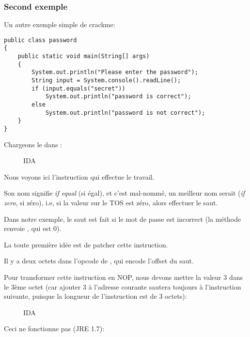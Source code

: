 \subsubsection{Second exemple}

Un autre exemple simple de crackme:

\begin{lstlisting}[style=customjava]
public class password
{
	public static void main(String[] args)
	{
		System.out.println("Please enter the password");
		String input = System.console().readLine();
		if (input.equals("secret"))
			System.out.println("password is correct");
		else
			System.out.println("password is not correct");
	}
}
\end{lstlisting}

Chargeons le dans \IDA:

\begin{figure}[H]
\centering
{}
\caption{IDA}
\end{figure}

Nous voyons ici l'instruction  qui effectue le travail.

Son nom signifie \emph{if equal} (si égal), et c'est mal-nommé, un meilleur nom serait
 (\emph{if zero}, si zéro), i.e, si la valeur sur le \ac{TOS} est zéro, alors
effectuer le saut.

Dans notre exemple, le saut est fait si le mot de passe est incorrect (la méthode
 renvoie , qui est 0).

La toute première idée est de patcher cette instruction.

Il y a deux octets dans l'opcode de , qui encode l'offset du saut.

Pour transformer cette instruction en NOP, nous devons mettre la valeur 3 dans le
3ème octet (car ajouter 3 à l'adresse courante sautera toujours à l'instruction
suivante, puisque la longueur de l'instruction  est de 3 octets):

\begin{figure}[H]
\centering
{}
\caption{IDA}
\end{figure}

Ceci ne fonctionne pas (JRE 1.7):


